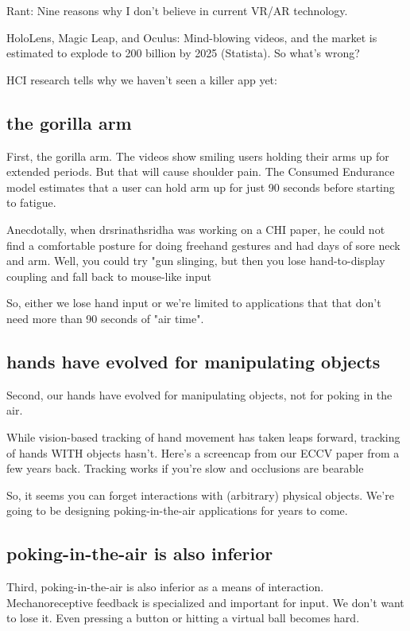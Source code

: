 Rant: Nine reasons why I don't believe in current VR/AR technology.

HoloLens, Magic Leap, and Oculus: Mind-blowing videos, and the market is estimated to explode to 200 billion by 2025 (Statista). So what's wrong?

HCI research tells why we haven't seen a killer app yet:




\subsection{the gorilla arm}

First, the gorilla arm. The videos show smiling users holding their arms up for extended periods. But that will cause shoulder pain. The Consumed Endurance model estimates that a user can hold arm up for just 90 seconds before starting to fatigue. 

Anecdotally, when drsrinathsridha was working on a CHI paper, he could not find a comfortable posture for doing freehand gestures and had days of sore neck and arm. Well, you could try "gun slinging, but then you lose hand-to-display coupling and fall back to mouse-like input

So, either we lose hand input or we're limited to applications that that don't need more than 90 seconds of "air time". 




\subsection{hands have evolved for manipulating objects}
Second, our hands have evolved for manipulating objects, not for poking in the air. 


While vision-based tracking of hand movement has taken leaps forward, tracking of hands WITH objects hasn't. Here's a screencap from our ECCV paper from a few years back. Tracking works if you're slow and occlusions are bearable


So, it seems you can forget interactions with (arbitrary) physical objects. We're going to be designing poking-in-the-air applications for years to come. 

\subsection{poking-in-the-air is also inferior}
Third, poking-in-the-air is also inferior as a means of interaction. Mechanoreceptive feedback is specialized and important for input. We don't want to lose it. Even pressing a button or hitting a virtual ball becomes hard. 

